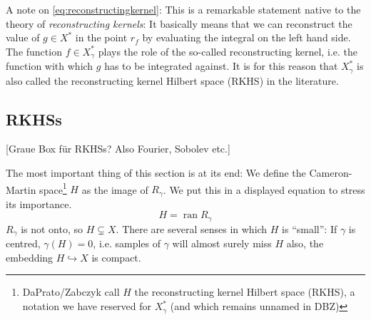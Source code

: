 \documentclass{scrartcl}
\theoremstyle{definition}
\theoremstyle{remark}
\newcommand{\ednote}[1]{{\color{red}[#1]}}
\DeclareRobustCommand{\mybox}[2][gray!20]{%
\begin{tcolorbox}[   %
        breakable,
        left=0pt,
        right=0pt,
        top=0pt,
        bottom=0pt,
        colback=#1,
        colframe=#1,
        width=\dimexpr\textwidth\relax, 
        enlarge left by=0mm,
        boxsep=5pt,
        arc=0pt,outer arc=0pt,
        ]
        #2
\end{tcolorbox}
}
\begin{document}
A note on \eqref{eq:reconstructingkernel}: This is a remarkable statement native to the theory of \textit{reconstructing kernels}: It basically means that we can reconstruct the value of $g\in X^*$ in the point $r_f$ by evaluating the integral on the left hand side. The function $f\in X_\gamma^*$ plays the role of the so-called reconstructing kernel, i.e. the function with which $g$ has to be integrated against. It is for this reason that $X_\gamma^*$ is also called the reconstructing kernel Hilbert space (RKHS) in the literature. 
\mybox{\subsection*{RKHSs}
\ednote{Graue Box für RKHSs? Also Fourier, Sobolev etc.}}

The most important thing of this section is at its end: We define the Cameron-Martin space\footnote{DaPrato/Zabczyk call $H$ the reconstructing kernel Hilbert space (RKHS), a notation we have reserved for $X_\gamma^*$ (and which remains unnamed in DBZ)} $H$ as the image of $R_\gamma$. We put this in a displayed equation to stress its importance.
\begin{displaymath}
H = \operatorname{ran} R_\gamma
\end{displaymath}
$R_\gamma$ is not onto, so $H\subsetneq X$. There are several senses in which $H$ is ``small'': If $\gamma$ is centred, $\gamma(H) = 0$, i.e. samples of $\gamma$ will almost surely miss $H$ also, the embedding $H\hookrightarrow X$ is compact.
\end{document}
